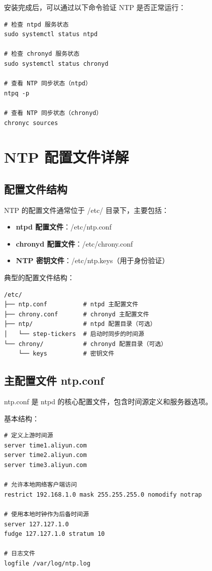 \documentclass[12pt,UTF8]{ctexbook}
\begin{document}
安装完成后，可以通过以下命令验证 NTP 是否正常运行：

\begin{verbatim}
# 检查 ntpd 服务状态
sudo systemctl status ntpd

# 检查 chronyd 服务状态
sudo systemctl status chronyd

# 查看 NTP 同步状态（ntpd）
ntpq -p

# 查看 NTP 同步状态（chronyd）
chronyc sources
\end{verbatim}

\chapter{NTP 配置文件详解}
\label{chap:ntp_config}

\section{配置文件结构}
\label{sec:config_structure}

NTP 的配置文件通常位于 /etc/ 目录下，主要包括：

\begin{itemize}
    \item \textbf{ntpd 配置文件}：/etc/ntp.conf
    \item \textbf{chronyd 配置文件}：/etc/chrony.conf
    \item \textbf{NTP 密钥文件}：/etc/ntp.keys（用于身份验证）
\end{itemize}

典型的配置文件结构：
\begin{verbatim}
/etc/
├── ntp.conf          # ntpd 主配置文件
├── chrony.conf       # chronyd 主配置文件
├── ntp/              # ntpd 配置目录（可选）
│   └── step-tickers  # 启动时同步的时间源
└── chrony/           # chronyd 配置目录（可选）
    └── keys          # 密钥文件
\end{verbatim}

\section{主配置文件 ntp.conf}
\label{sec:ntp_conf}

ntp.conf 是 ntpd 的核心配置文件，包含时间源定义和服务器选项。

基本结构：
\begin{verbatim}
# 定义上游时间源
server time1.aliyun.com
server time2.aliyun.com
server time3.aliyun.com

# 允许本地网络客户端访问
restrict 192.168.1.0 mask 255.255.255.0 nomodify notrap

# 使用本地时钟作为后备时间源
server 127.127.1.0
fudge 127.127.1.0 stratum 10

# 日志文件
logfile /var/log/ntp.log
\end{verbatim}
\end{document}
